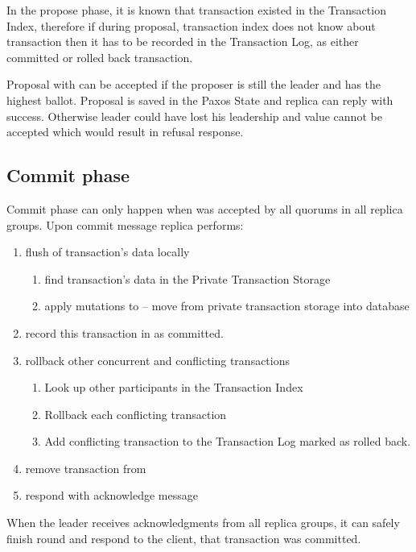 In the propose phase, it is known that transaction existed in the Transaction Index, therefore if during proposal,  transaction index does not know about transaction then it has to be recorded in the Transaction Log, as either committed or rolled back transaction.

Proposal with \txState can be accepted if the proposer is still the leader and has the highest ballot. Proposal is saved in the Paxos State and replica can reply with success. Otherwise leader could have lost his leadership and value cannot be accepted which would result in refusal response.


\subsection{Commit phase}
Commit phase can only happen when \txState was accepted by all quorums in all replica groups. Upon commit message replica performs:
\begin{enumerate}
\item flush of transaction’s data locally
\begin{enumerate}
   \item find transaction’s data in the Private Transaction Storage
   \item apply mutations to \database -- move \mutations from private transaction storage into database
   \end{enumerate}
\item record this transaction in \txLog as committed.
\item rollback other concurrent and conflicting transactions
 \begin{enumerate}
   \item Look up other participants in the Transaction Index
   \item Rollback each conflicting transaction
   \item Add conflicting transaction to the Transaction Log marked as rolled back.
  \end{enumerate}
\item remove transaction from \txIndex
\item respond with acknowledge message
\end{enumerate}

When the leader receives acknowledgments from all replica groups, it can safely finish \mpt round and respond to the client, that transaction was committed.


